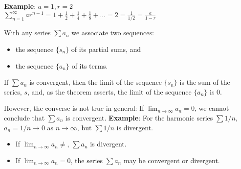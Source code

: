 \begin{paracol}{2}
\textbf{Example}: $a = 1, r = 2$ \\
$\sum_{n=1}^\infty a r^{n-1} = 1 + \frac{1}{2} + \frac{1}{4} + \frac{1}{8} + \dots = 2 = \frac{1}{1 / 2} = \frac{a}{1 - r}$

\switchcolumn


With any series $\sum a_n$ we associate two sequences:

\begin{itemize}
    \item the sequence $\{s_n\}$ of its partial sums, and
    \item the sequence $\{a_n\}$ of its terms.
\end{itemize}

If $\sum a_n$ is convergent, then the limit of the sequence $\{s_n\}$ is the sum of the series, $s$, and, as the theorem asserts, the limit of the sequence $\{a_n\}$ is $0$.

However, the converse is not true in general: If $\lim_{n \rightarrow \infty} a_n = 0$, we cannot conclude that $\sum a_n$ is convergent. \textbf{Example}: For the harmonic series $\sum 1 / n$, $a_n = 1 / n \rightarrow 0$ as $n \rightarrow \infty$, but $\sum 1 / n$ is divergent.

\switchcolumn


\begin{itemize}
    \item If $\lim_{n \rightarrow \infty} a_n \neq$, $\sum a_n$ is divergent.
    \item If $\lim_{n \rightarrow \infty} a_n = 0$, the series $\sum a_n$ may be convergent or divergent.
\end{itemize}


\end{paracol}
